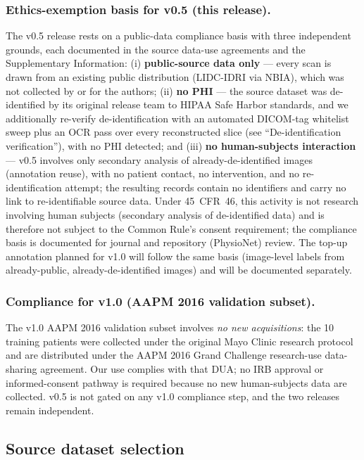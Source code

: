\documentclass[twoside,11pt]{article}
\begin{document}
\subsubsection*{Ethics-exemption basis for v0.5 (this release).}
The v0.5 release rests on a public-data compliance basis with three independent grounds, each documented in the source data-use agreements and the Supplementary Information: (i) \textbf{public-source data only} --- every scan is drawn from an existing public distribution (LIDC-IDRI via NBIA), which was not collected by or for the authors; (ii) \textbf{no PHI} --- the source dataset was de-identified by its original release team to HIPAA Safe Harbor standards, and we additionally re-verify de-identification with an automated DICOM-tag whitelist sweep plus an OCR pass over every reconstructed slice (see ``De-identification verification''), with no PHI detected; and (iii) \textbf{no human-subjects interaction} --- v0.5 involves only secondary analysis of already-de-identified images (annotation reuse), with no patient contact, no intervention, and no re-identification attempt; the resulting records contain no identifiers and carry no link to re-identifiable source data. Under 45~CFR~46, this activity is not research involving human subjects (secondary analysis of de-identified data) and is therefore not subject to the Common Rule's consent requirement; the compliance basis is documented for journal and repository (PhysioNet) review. The top-up annotation planned for v1.0 will follow the same basis (image-level labels from already-public, already-de-identified images) and will be documented separately.

\subsubsection*{Compliance for v1.0 (AAPM 2016 validation subset).}
The v1.0 AAPM 2016 validation subset involves \emph{no new acquisitions}: the 10 training patients were collected under the original Mayo Clinic research protocol and are distributed under the AAPM 2016 Grand Challenge research-use data-sharing agreement. Our use complies with that DUA; no IRB approval or informed-consent pathway is required because no new human-subjects data are collected. v0.5 is not gated on any v1.0 compliance step, and the two releases remain independent.

\subsection*{Source dataset selection}
\end{document}
